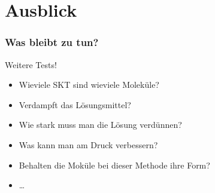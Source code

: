 \documentclass{beamer}
\begin{document}
\section*{Ausblick}

\begin{frame}
\frametitle<presentation>{Was bleibt zu tun?}
Weitere Tests!
\vspace{0.5cm}
\begin{itemize}\setlength{\itemsep}{+15pt}
  \item Wieviele SKT sind wieviele Moleküle?
  \item Verdampft das Lösungsmittel?
  \item Wie stark muss man die Lösung verdünnen?
  \item Was kann man am Druck verbessern?
  \item Behalten die Moküle bei dieser Methode ihre Form?
  \item \ldots
  
\end{itemize}
\end{frame}
\end{document}
